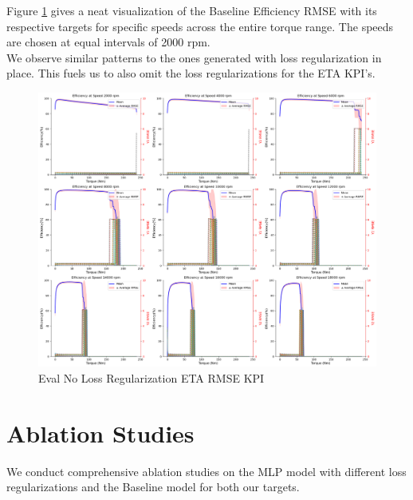 \documentclass{report} %
\begin{document}
Figure \ref{fig:Eval No Loss Regularization ETA RMSE KPI} gives a neat visualization of the Baseline Efficiency \ac{RMSE} with its respective targets for specific speeds across the entire torque range.
The speeds are chosen at equal intervals of 2000 rpm.\\
We observe similar patterns to the ones generated with loss regularization in place.
This fuels us to also omit the loss regularizations for the ETA \ac{KPI}'s.\\
\begin{figure}[H]
    \centering
    \includegraphics[width=1\textwidth]{./ReportImages/rmse_eta_no_lossreg_MLP.png} 
    \caption{Eval No Loss Regularization ETA \ac{RMSE} \ac{KPI}} 
    \label{fig:Eval No Loss Regularization ETA RMSE KPI}
\end{figure}

\section{Ablation Studies}\label{sec:Ablation Studies}

We conduct comprehensive ablation studies on the \ac{MLP} model with different loss regularizations and the Baseline model for both our targets.
\end{document}
